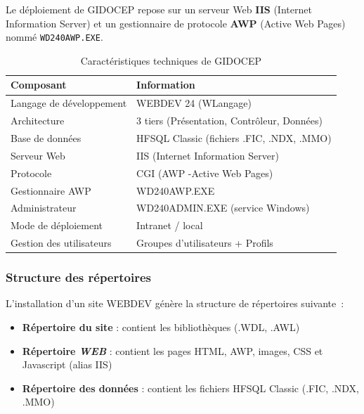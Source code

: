 \documentclass[12pt,a4paper,oneside]{report}
\begin{document}
Le déploiement de GIDOCEP repose sur un serveur Web \textbf{IIS} (Internet Information Server) et un gestionnaire de protocole \textbf{AWP} (Active Web Pages) nommé \texttt{WD240AWP.EXE}.

\begin{table}[H]
	\centering\small
	\caption{Caractéristiques techniques de GIDOCEP}
	\label{tab:gidocep_tech}
	\begin{tabularx}{\textwidth}{p{4.5cm}X}
		\toprule
		\rowcolor{theadcolor}
		\color{white}\textbf{Composant} &
		\color{white}\textbf{Information} \\
		\midrule
		Langage de développement & WEBDEV 24 (WLangage) \\
		Architecture & 3 tiers (Présentation, Contrôleur, Données) \\
		Base de données & HFSQL Classic (fichiers .FIC, .NDX, .MMO) \\
		Serveur Web & IIS (Internet Information Server) \\
		Protocole & CGI (AWP -Active Web Pages) \\
		Gestionnaire AWP & WD240AWP.EXE \\
		Administrateur & WD240ADMIN.EXE (service Windows) \\
		Mode de déploiement & Intranet / local \\
		Gestion des utilisateurs & Groupes d'utilisateurs + Profils \\
		\bottomrule
	\end{tabularx}
\end{table}

\subsubsection{Structure des répertoires}

L'installation d'un site WEBDEV génère la structure de répertoires suivante~:

\begin{itemize}[label={\color{gold}}, leftmargin=*]
	\item \textbf{Répertoire du site} : contient les bibliothèques (.WDL, .AWL)
	\item \textbf{Répertoire \textit{WEB}} : contient les pages HTML, AWP, images, CSS et Javascript (alias IIS)
	\item \textbf{Répertoire des données} : contient les fichiers HFSQL Classic (.FIC, .NDX, .MMO)
\end{itemize}
\end{document}
